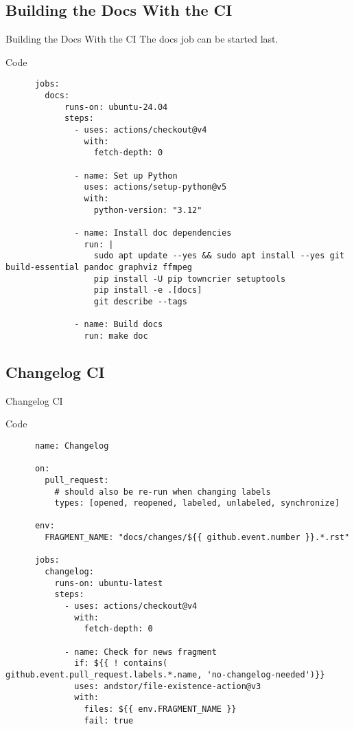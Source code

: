 \subsection{Building the Docs With the CI}
\begin{frame}[fragile]{Building the Docs With the CI}
  The docs job can be started last.
  \begin{block}{Code}
  \footnotesize
    \begin{verbatim}
      jobs:
        docs:
            runs-on: ubuntu-24.04
            steps:
              - uses: actions/checkout@v4
                with:
                  fetch-depth: 0

              - name: Set up Python
                uses: actions/setup-python@v5
                with:
                  python-version: "3.12"

              - name: Install doc dependencies
                run: |
                  sudo apt update --yes && sudo apt install --yes git build-essential pandoc graphviz ffmpeg
                  pip install -U pip towncrier setuptools
                  pip install -e .[docs]
                  git describe --tags

              - name: Build docs
                run: make doc
    \end{verbatim}
  \end{block}
\end{frame}


\subsection{Changelog CI}
\begin{frame}[fragile]{Changelog CI}
  \begin{block}{Code}
    \footnotesize
    \begin{verbatim}
      name: Changelog

      on:
        pull_request:
          # should also be re-run when changing labels
          types: [opened, reopened, labeled, unlabeled, synchronize]

      env:
        FRAGMENT_NAME: "docs/changes/${{ github.event.number }}.*.rst"

      jobs:
        changelog:
          runs-on: ubuntu-latest
          steps:
            - uses: actions/checkout@v4
              with:
                fetch-depth: 0

            - name: Check for news fragment
              if: ${{ ! contains( github.event.pull_request.labels.*.name, 'no-changelog-needed')}}
              uses: andstor/file-existence-action@v3
              with:
                files: ${{ env.FRAGMENT_NAME }}
                fail: true
    \end{verbatim}
  \end{block}
\end{frame}

